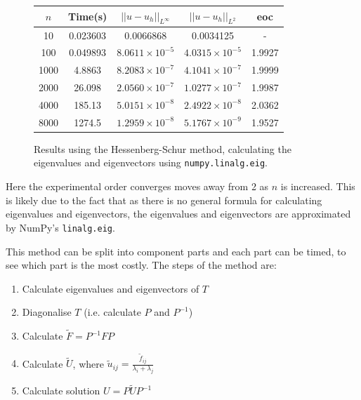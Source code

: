\documentclass{article}
\numberwithin{equation}{section}
\begin{document}
\begin{figure}
\begin{table}[H]
\centering
\begin{tabular}{|c|c|c|c|c|}
\hline
$n$ & Time(s) & $|| u - u_h ||_{L^{\infty}}$ &$|| u - u_h ||_{L^{2}}$ & eoc \\
\hline
10 & 0.023603 & 0.0066868 & 0.0034125 & - \\
100 & 0.049893 & $8.0611 \times 10^{-5}$ & $4.0315 \times 10^{-5}$ & 1.9927  \\ 
1000 & 4.8863 & $8.2083 \times 10^{-7}$ & $4.1041 \times 10^{-7}$ & 1.9999  \\
2000 & 26.098 & $2.0560 \times 10^{-7}$ & $1.0277 \times 10^{-7}$ & 1.9987 \\
4000 & 185.13 & $5.0151 \times 10^{-8}$ & $2.4922 \times 10^{-8}$ & 2.0362 \\
8000 & 1274.5 & $1.2959 \times 10^{-8}$ & $5.1767 \times 10^{-9}$ & 1.9527 \\
\hline
\end{tabular}
\end{table}
\caption{Results using the Hessenberg-Schur method, calculating the eigenvalues and eigenvectors using \texttt{numpy.linalg.eig}.}
\end{figure}

Here the experimental order converges moves away from 2 as $n$ is increased. This is likely due to the fact that as there is no general formula for calculating eigenvalues and eigenvectors, the eigenvalues and eigenvectors are approximated by NumPy's \texttt{linalg.eig}.

This method can be split into component parts and each part can be timed, to see which part is the most costly. The steps of the method are:
\begin{enumerate}
\item Calculate eigenvalues and eigenvectors of $T$
\item Diagonalise $T$ (i.e. calculate $P$ and $P^{-1}$)
\item Calculate $\tilde{F}=P^{-1}FP$
\item Calculate $\tilde{U}$, where $\tilde{u}_{ij} = \frac{\tilde{f}_{ij}}{\lambda_i + \lambda_j}$
\item Calculate solution $U=P \tilde{U}P^{-1}$
\end{enumerate}
\end{document}
